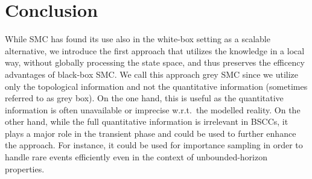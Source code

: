 \section{Conclusion}

While SMC has found its use also in the white-box setting as a scalable alternative, we introduce the first approach that utilizes the knowledge in a local way, without globally processing the state space, and thus preserves the efficency advantages of black-box SMC.
We call this approach grey SMC since we utilize only the topological information and not the quantitative information (sometimes referred to as grey box).
On the one hand, this is useful as the quantitative information is often unavailable or imprecise w.r.t.\ the modelled reality.
On the other hand, while the full quantitative information is irrelevant in BSCCs, it plays a major role in the transient phase and could be used to further enhance the approach. For instance, it could be used for importance sampling in order to handle rare events efficiently \cite{DBLP:conf/cav/JegourelLS12,DBLP:conf/setta/BuddeDH17} even in the context of unbounded-horizon properties.
